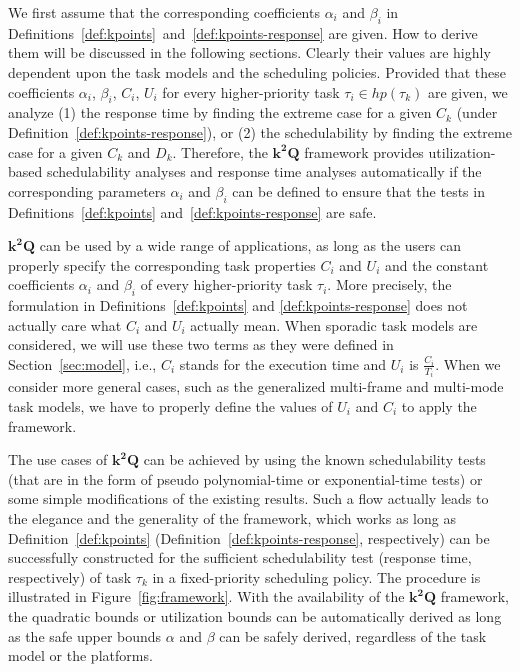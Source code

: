 \documentclass[10pt,conference]{IEEEtran}
\newcommand{\frameworkkq}[1]{$\mathbf{k^2Q}$}
\begin{document}
We first assume that the corresponding coefficients $\alpha_i$ and
$\beta_i$ in
Definitions~\ref{def:kpoints}~and~\ref{def:kpoints-response} are
given. How to derive them will be discussed in the following sections.
Clearly their values are highly dependent upon the task models and the
scheduling policies.  Provided that these coefficients $\alpha_i$,
$\beta_i$, $C_i$, $U_i$ for every higher-priority task $\tau_i \in
hp(\tau_k)$ are given, we analyze (1) the response time by finding the
extreme case for a given $C_k$ (under
Definition~\ref{def:kpoints-response}), or (2) the schedulability by
finding the extreme case for a given $C_k$ and $D_k$. Therefore, the
\frameworkkq{} framework provides utilization-based schedulability
analyses and response time analyses automatically if the
corresponding parameters $\alpha_i$ and $\beta_i$ can be defined to
ensure that the tests in Definitions~\ref{def:kpoints}
and~\ref{def:kpoints-response} are safe.

\frameworkkq{} can be used by a wide range of applications, as long
as the users can properly specify the corresponding task properties
$C_i$ and $U_i$ and the constant coefficients $\alpha_i$ and $\beta_i$
of every higher-priority task $\tau_i$. More precisely, the formulation in
Definitions~\ref{def:kpoints} and \ref{def:kpoints-response} does not
actually care what $C_i$ and $U_i$ actually mean. When sporadic
task models are considered, we will use these two terms as they were
defined in Section~\ref{sec:model}, i.e., $C_i$ stands for the
execution time and  $U_i$ is $\frac{C_i}{T_i}$. When we consider more
general cases, such as the generalized multi-frame and multi-mode task
models, we have to properly define the values of $U_i$ and $C_i$ to
apply the framework.

The use cases of \frameworkkq{} can be achieved by using
the known schedulability tests (that are in the form of pseudo
polynomial-time or exponential-time tests) or some simple modifications of the existing
results.   
Such a flow actually leads to the elegance and the
generality of the framework, which works as long as
Definition~\ref{def:kpoints} (Definition~\ref{def:kpoints-response},
respectively) can be successfully constructed for the sufficient
schedulability test (response time, respectively) of task $\tau_k$ in
a fixed-priority scheduling policy. The procedure is illustrated in Figure~\ref{fig:framework}.
With the availability of the \frameworkkq{} framework, the quadratic
bounds or utilization bounds can be automatically derived as
long as the safe upper bounds $\alpha$ and $\beta$ can be safely
derived, regardless of the task model or the platforms. 
\end{document}
